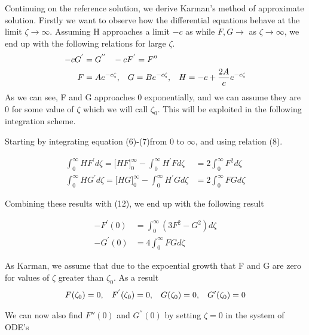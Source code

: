 \documentclass[a4paper,norsk]{article}
\begin{document}
\newpage

Continuing on the reference solution, we derive Karman's method of approximate solution.
Firstly we want to observe how the differential equations behave at the limit $\zeta \rightarrow \infty$.
Assuming H approaches a limit $-c$ as while $F, G \rightarrow $ as $\zeta \rightarrow \infty$, we end
up with the following relations for large $\zeta$.
\begin{align}
-cG^{'} &= G^{''} \hspace{3mm} -cF^{'} = F{''} \\
F &= Ae^{-c\zeta}, \hspace{3mm} G = Be^{-c \zeta}, \hspace{3mm} H = -c + \frac{2A}{c}e^{-c\zeta}
\end{align}
As we can see, F and G approaches 0 exponentially, and we can assume they are 0 for some value of $\zeta$
which we will call $\zeta_0$.
This will be exploited in the following integration scheme.

Starting by integrating equation (6)-(7)from 0 to $\infty$, and using relation (8).

\begin{align*}
\int_0^\infty HF^{'} d\zeta = \big[HF \big]_0^\infty - \int_0^\infty H^{'}F d\zeta
&= 2\int_0^\infty F^2 d\zeta \\
\int_0^\infty HG^{'} d\zeta = \big[HG \big]_0^\infty - \int_0^\infty H^{'}G d\zeta
&= 2\int_0^\infty FG d\zeta
\end{align*}

Combining these results with (12), we end up with the following result

\begin{align}
-F^{'}(0) &= \int_0^\infty (3F^2 - G^2) d\zeta \\
-G^{'}(0) &= 4 \int_0^\infty FG d\zeta
\end{align}

As Karman, we assume that due to the expoential growth that F and G are zero for
values of $\zeta$ greater than $\zeta_0$. As a result
\begin{align}
F(\zeta_0) = 0, \hspace{3mm} F^{'}(\zeta_0) = 0, \hspace{3mm}
G(\zeta_0) = 0, \hspace{3mm} G'(\zeta_0) = 0
\end{align}

We can now also find $F{''}(0)$ and $G^{''}(0)$ by setting $\zeta = 0$ in the system of ODE's
\end{document}
